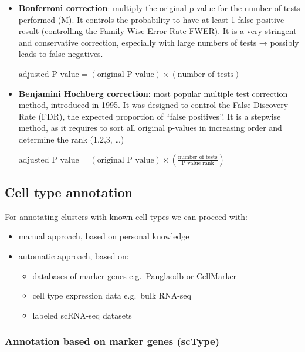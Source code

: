 \begin{itemize}
\item
  \textbf{Bonferroni correction}: multiply the original p-value for the
  number of tests performed (M). It controls the probability to have at
  least 1 false positive result (controlling the Family Wise Error Rate
  FWER). It is a very stringent and conservative correction, especially
  with large numbers of tests → possibly leads to false negatives.

  \(\text{adjusted P value} = (\text{original P value}) \times (\text{number of tests})\)
\item
  \textbf{Benjamini Hochberg correction}: most popular multiple test
  correction method, introduced in 1995. It was designed to control the
  False Discovery Rate (FDR), the expected proportion of ``false
  positives''. It is a stepwise method, as it requires to sort all
  original p-values in increasing order and determine the rank (1,2,3,
  \ldots)

  \(\text{adjusted P value} = (\text{original P value}) \times (\frac{\text{number of tests}}{\text{P value rank}})\)
\end{itemize}

\hypertarget{cell-type-annotation}{%
\subsection{Cell type annotation}\label{cell-type-annotation}}

For annotating clusters with known cell types we can proceed with:

\begin{itemize}
\tightlist
\item
  manual approach, based on personal knowledge
\item
  automatic approach, based on:

  \begin{itemize}
  \tightlist
  \item
    databases of marker genes e.g.~Panglaodb or CellMarker
  \item
    cell type expression data e.g.~bulk RNA-seq
  \item
    labeled scRNA-seq datasets
  \end{itemize}
\end{itemize}

\hypertarget{annotation-based-on-marker-genes-sctype}{%
\subsubsection{\texorpdfstring{\textbf{Annotation based on marker genes
(scType)}}{Annotation based on marker genes (scType)}}\label{annotation-based-on-marker-genes-sctype}}


